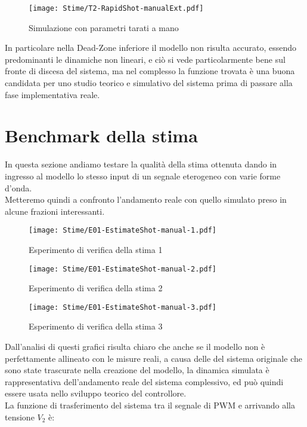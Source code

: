 \begin{figure}[H]
	\centering
	\caption[Simulazione con parametri tarati a mano]{Simulazione con parametri tarati a mano}
	\texttt{[image: Stime/T2-RapidShot-manualExt.pdf]}
\end{figure}
\noindent
In particolare nella Dead-Zone inferiore il modello non risulta accurato, essendo predominanti le dinamiche non lineari, e ciò si vede particolarmente bene sul fronte di discesa del sistema, ma nel complesso la funzione trovata è una buona candidata per uno studio teorico e simulativo del sistema prima di passare alla fase implementativa reale.

\section{Benchmark della stima}
In questa sezione andiamo testare la qualità della stima ottenuta dando in ingresso al modello lo stesso input di un segnale eterogeneo con varie forme d'onda.\\
Metteremo quindi a confronto l'andamento reale con quello simulato preso in alcune frazioni interessanti.
\begin{figure}[H]
	\centering
	\caption[Esperimento di verifica della stima 1]{Esperimento di verifica della stima 1}
	\texttt{[image: Stime/E01-EstimateShot-manual-1.pdf]}
\end{figure}

\begin{figure}[H]
	\centering
	\caption[Esperimento di verifica della stima 2]{Esperimento di verifica della stima 2}
	\texttt{[image: Stime/E01-EstimateShot-manual-2.pdf]}
\end{figure}
\vspace{-18mm}
\begin{figure}[H]
	\centering
	\caption[Esperimento di verifica della stima 3]{Esperimento di verifica della stima 3}
	\texttt{[image: Stime/E01-EstimateShot-manual-3.pdf]}
\end{figure}
\noindent
Dall'analisi di questi grafici risulta chiaro che anche se il modello non è perfettamente allineato con le misure reali, a causa delle \nonLinearita del sistema originale che sono state trascurate nella creazione del modello, la dinamica simulata è rappresentativa dell'andamento reale del sistema complessivo, ed può quindi essere usata nello sviluppo teorico del controllore.\\
La funzione di trasferimento del sistema tra il segnale di PWM e arrivando alla tensione $ V_2 $ è:

